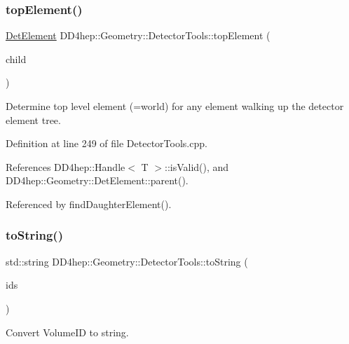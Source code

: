 \subsubsection{\texorpdfstring{top\+Element()}{topElement()}}
{\footnotesize\ttfamily \hyperlink{class_d_d4hep_1_1_geometry_1_1_det_element}{Det\+Element} D\+D4hep\+::\+Geometry\+::\+Detector\+Tools\+::top\+Element (\begin{DoxyParamCaption}\item[{\hyperlink{class_d_d4hep_1_1_geometry_1_1_det_element}{Det\+Element}}]{child }\end{DoxyParamCaption})}



Determine top level element (=world) for any element walking up the detector element tree. 



Definition at line 249 of file Detector\+Tools.\+cpp.



References D\+D4hep\+::\+Handle$<$ T $>$\+::is\+Valid(), and D\+D4hep\+::\+Geometry\+::\+Det\+Element\+::parent().



Referenced by find\+Daughter\+Element().

\hypertarget{namespace_d_d4hep_1_1_geometry_1_1_detector_tools_accc8aeaf883652cfb64beae7479b9f11}{}\label{namespace_d_d4hep_1_1_geometry_1_1_detector_tools_accc8aeaf883652cfb64beae7479b9f11} 
\subsubsection{\texorpdfstring{to\+String()}{toString()}\hspace{0.1cm}{\footnotesize\ttfamily [1/2]}}
{\footnotesize\ttfamily std\+::string D\+D4hep\+::\+Geometry\+::\+Detector\+Tools\+::to\+String (\begin{DoxyParamCaption}\item[{const \hyperlink{class_d_d4hep_1_1_geometry_1_1_placed_volume_a4383991fbc94adc2997ef98c9d30d9a6}{Placed\+Volume\+::\+Vol\+I\+Ds} \&}]{ids }\end{DoxyParamCaption})}



Convert Volume\+ID to string. 



